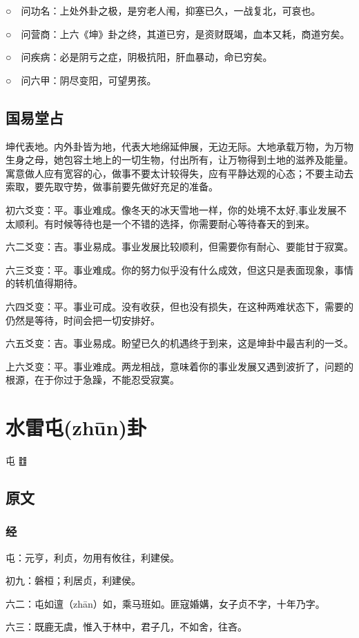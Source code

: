 \documentclass[12pt,oneside]{book}
\begin{document}
○　问功名：上处外卦之极，是穷老人闱，抑塞已久，一战复北，可哀也。

○　问营商：上六《坤》卦之终，其道已穷，是资财既竭，血本又耗，商道穷矣。

○　问疾病：必是阴亏之症，阴极抗阳，肝血暴动，命已穷矣。

○　问六甲：阴尽变阳，可望男孩。


\section{国易堂占}
坤代表地。内外卦皆为地，代表大地绵延伸展，无边无际。大地承载万物，为万物生身之母，她包容土地上的一切生物，付出所有，让万物得到土地的滋养及能量。寓意做人应有宽容的心，做事不要太计较得失，应有平静达观的心态；不要主动去索取，要先取守势，做事前要先做好充足的准备。

初六爻变：平。事业难成。像冬天的冰天雪地一样，你的处境不太好,事业发展不太顺利。有时候等待也是一个不错的选择，你需要耐心等待春天的到来。

六二爻变：吉。事业易成。事业发展比较顺利，但需要你有耐心、要能甘于寂寞。

六三爻变：平。事业难成。你的努力似乎没有什么成效，但这只是表面现象，事情的转机值得期待。

六四爻变：平。事业可成。没有收获，但也没有损失，在这种两难状态下，需要的仍然是等待，时间会把一切安排好。

六五爻变：吉。事业易成。盼望已久的机遇终于到来，这是坤卦中最吉利的一爻。

上六爻变：平。事业难成。两龙相战，意味着你的事业发展又遇到波折了，问题的根源，在于你过于急躁，不能忍受寂寞。


\chapter{水雷屯(zhūn)卦}
屯 {\Large ䷂}

\section{原文}
\subsection{经}
屯：元亨，利贞，勿用有攸往，利建侯。

初九：磐桓；利居贞，利建侯。

六二：屯如邅（zhān）如，乘马班如。匪寇婚媾，女子贞不字，十年乃字。

六三：既鹿无虞，惟入于林中，君子几，不如舍，往吝。
\end{document}
